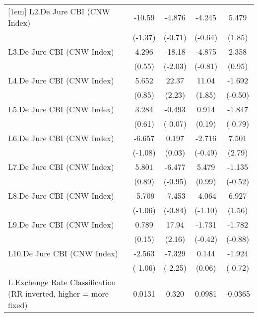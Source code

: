 {\begin{longtable}{l*{4}{c}}
[1em]
L2.De Jure CBI (CNW Index)&   -10.59         &   -4.876         &   -4.245         &    5.479         \\
                &  (-1.37)         &  (-0.71)         &  (-0.64)         &   (1.85)         \\
[1em]
L3.De Jure CBI (CNW Index)&    4.296         &   -18.18\sym{*}  &   -4.875         &    2.358         \\
                &   (0.55)         &  (-2.03)         &  (-0.81)         &   (0.95)         \\
[1em]
L4.De Jure CBI (CNW Index)&    5.652         &    22.37\sym{*}  &    11.04         &   -1.692         \\
                &   (0.85)         &   (2.23)         &   (1.85)         &  (-0.50)         \\
[1em]
L5.De Jure CBI (CNW Index)&    3.284         &   -0.493         &    0.914         &   -1.847         \\
                &   (0.61)         &  (-0.07)         &   (0.19)         &  (-0.79)         \\
[1em]
L6.De Jure CBI (CNW Index)&   -6.657         &    0.197         &   -2.716         &    7.501\sym{**} \\
                &  (-1.08)         &   (0.03)         &  (-0.49)         &   (2.79)         \\
[1em]
L7.De Jure CBI (CNW Index)&    5.801         &   -6.477         &    5.479         &   -1.135         \\
                &   (0.89)         &  (-0.95)         &   (0.99)         &  (-0.52)         \\
[1em]
L8.De Jure CBI (CNW Index)&   -5.709         &   -7.453         &   -4.064         &    6.927         \\
                &  (-1.06)         &  (-0.84)         &  (-1.10)         &   (1.56)         \\
[1em]
L9.De Jure CBI (CNW Index)&    0.789         &    17.94\sym{*}  &   -1.731         &   -1.782         \\
                &   (0.15)         &   (2.16)         &  (-0.42)         &  (-0.88)         \\
[1em]
L10.De Jure CBI (CNW Index)&   -2.563         &   -7.329\sym{*}  &    0.144         &   -1.924         \\
                &  (-1.06)         &  (-2.25)         &   (0.06)         &  (-0.72)         \\
[1em]
L.Exchange Rate Classification (RR inverted, higher = more fixed)&   0.0131         &    0.320         &   0.0981         &  -0.0365         \\

\end{longtable}}
